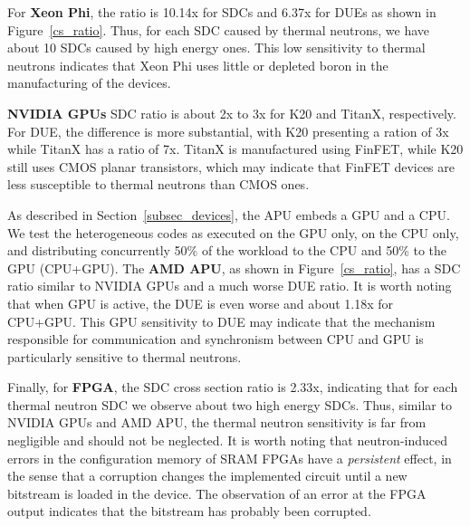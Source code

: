 For \textbf{Xeon Phi}, the ratio is 10.14x for SDCs and 6.37x for DUEs as shown in Figure~\ref{cs_ratio}. Thus, for each SDC caused by thermal neutrons, we have about 10 SDCs caused by high energy ones. This low sensitivity to thermal neutrons indicates that Xeon Phi uses little or depleted boron in the manufacturing of the devices.

\textbf{NVIDIA GPUs} SDC ratio is about 2x to 3x for K20 and TitanX, respectively. For DUE, the difference is more substantial, with K20 presenting a ration of 3x while TitanX has a ratio of 7x. TitanX is manufactured using FinFET, while K20 still uses CMOS planar transistors, which may indicate that FinFET devices are less susceptible to thermal neutrons than CMOS ones.

As described in Section~\ref{subsec_devices}, the APU embeds a GPU and a CPU. We test the heterogeneous codes as executed on the GPU only, on the CPU only, and distributing concurrently 50\% of the workload to the CPU and 50\% to the GPU (CPU+GPU). The \textbf{AMD APU}, as shown in Figure~\ref{cs_ratio}, has a SDC ratio similar to NVIDIA GPUs and a much worse DUE ratio. It is worth noting that when GPU is active, the DUE is even worse and about 1.18x for CPU+GPU. This GPU sensitivity to DUE may indicate that the mechanism responsible for communication and synchronism between CPU and GPU is particularly sensitive to thermal neutrons.

Finally, for \textbf{FPGA}, the SDC cross section ratio is 2.33x, indicating that for each thermal neutron SDC we observe about two high energy SDCs. Thus, similar to NVIDIA GPUs and AMD APU, the thermal neutron sensitivity is far from negligible and should not be neglected.
It is worth noting that neutron-induced errors in the configuration memory of SRAM FPGAs have a \textit{persistent} effect, in the sense that a corruption changes the implemented circuit until a new bitstream is loaded in the device. The observation of an error at the FPGA output indicates that the bitstream has probably been corrupted. 



